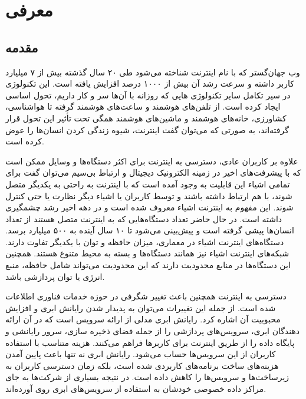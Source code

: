 \chapter{معرفی}

\section{مقدمه‌}

وب جهان‌گستر که با نام اینترنت شناخته می‌شود طی ۲۰ سال گذشته بیش از ۷ میلیارد کاربر داشته و سرعت رشد آن بیش از ۱۰۰۰ درصد افزایش یافته است. این تکنولوژی در سیر تکامل سایر تکنولوژی هایی که روزانه با آن‌ها سر و کار داریم، تحول اساسی ایجاد کرده است. از تلفن‌های هوشمند و ساعت‌های هوشمند گرفته تا هواشناسی، کشاورزی، خانه‌های هوشمند و ماشین‌های هوشمند همگی تحت تأثیر این تحول قرار گرفته‌اند، به صورتی که می‌توان گفت اینترنت، شیوه زندگی کردن انسان‌ها را عوض کرده ‌است.

علاوه‌ بر کاربران عادی، دسترسی به اینترنت برای اکثر دستگاه‌ها و وسایل ممکن است که با پیشرفت‌های اخیر در زمینه الکترونیک دیجیتال و ارتباط بی‌سیم می‌توان گفت برای تمامی اشیاء این قابلیت به وجود آمده است که با اینترنت به راحتی به یکدیگر متصل شوند، با هم ارتباط داشته باشند و توسط کاربران یا اشیاء دیگر نظارت یا حتی کنترل شوند. این مفهوم به اینترنت اشیاء معروف شده است و در دهه اخیر رشد چشمگیری داشته است. در حال حاضر تعداد دستگاه‌هایی که به اینترنت متصل هستند از تعداد انسان‌ها پیشی گرفته است و پیش‌بینی می‌شود تا ۱۰ سال آینده به ۵۰۰ میلیارد برسد. دستگاه‌های اینترنت اشیاء در معماری، میزان حافظه و توان با یکدیگر تفاوت دارند. شبکه‌های اینترنت اشیاء نیز همانند دستگاه‌ها و بسته به محیط متنوع هستند. همچنین این دستگاه‌ها در منابع محدودیت دارند که این محدودیت می‌تواند شامل حافظه، منبع انرژی یا توان پردازشی باشد.

دسترسی به اینترنت همچنین باعث تغییر شگرفی در حوزه خدمات فناوری اطلاعات شده است. از جمله این تغییرات می‌توان به پدیدار شدن رایانش ابری و افزایش محبوبیت آن اشاره کرد. رایانش ابری مدلی از ارائه سرویس است که در آن ارائه دهندگان ابری، سرویس‌های پردازشی را از جمله فضای ذخیره سازی، سرور‌ رایانشی و پایگاه داده‌ را از طریق اینترنت برای کاربر‌ها فراهم می‌کنند. هزینه متناسب با استفاده کاربران از این سرویس‌ها حساب می‌شود. رایانش ابری نه تنها باعث پایین آمدن هزینه‌های ساخت برنامه‌های کاربردی شده است، بلکه زمان دسترسی کاربران به زیرساخت‌ها و سرویس‌ها را کاهش داده است. در نتیجه بسیاری از شرکت‌ها به جای مراکز داده خصوصی خودشان به استفاده از سرویس‌های ابری روی آورده‌اند.

\hfill

